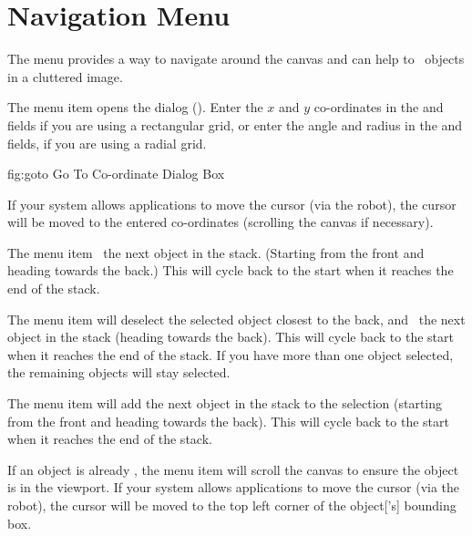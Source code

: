 \section{Navigation Menu}\label{sec:navigate}


The  menu provides a way to navigate around the
\gls{canvas} and can help to \select\ \glspl{object}
in a cluttered image.


The  menu item opens the
 dialog ().  Enter the
$x$ and $y$ co-ordinates in the  and
 fields if you are using a rectangular grid,
or enter the angle and radius in the  and
 fields, if you are using a radial grid.

\FloatFig
  {fig:goto}
  {}
  {Go To Co-ordinate Dialog Box}

If your system allows applications to move the cursor
(via the \gls{robot}), the cursor will be moved to the entered
co-ordinates (scrolling the \gls{canvas} if necessary).


The  menu item 
\selects\ the next \gls{object} in the \gls{stack}. (Starting from the
\gls{front} and heading towards the \gls{back}.) This will cycle back to
the start when it reaches the end of the \gls{stack}.


The  menu item will deselect the
selected \gls{object} closest to the \gls{back}, and \select\
the next \gls{object} in the \gls{stack} (heading towards the \gls{back}). This
will cycle back to the start when it reaches the end of the stack.
If you have more than one \gls{object} selected, the remaining
\glspl*{object} will stay selected.


The  menu item will add
the next \gls{object} in the \gls{stack} to the selection (starting from
the \gls{front} and heading towards the \gls{back}). This will cycle back to
the start when it reaches the end of the stack.


If an \gls{object} is already \selected, the 
menu item will scroll the \gls{canvas} to ensure the \gls{object} is
in the viewport. If your system allows applications to move the
cursor (via the \gls{robot}), the cursor will be moved to the top left corner of the
\gls{object}['s] bounding box.

